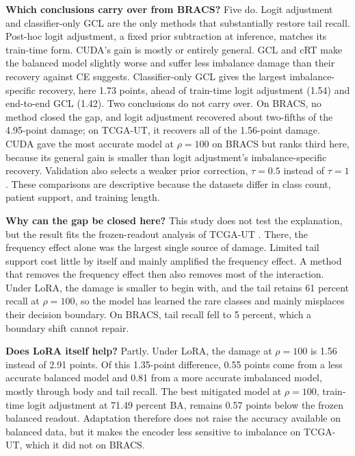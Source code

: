 \textbf{Which conclusions carry over from BRACS?} Five do. Logit adjustment and classifier-only GCL are the only methods that substantially restore tail recall. Post-hoc logit adjustment, a fixed prior subtraction at inference, matches its train-time form. CUDA's gain is mostly or entirely general. GCL and cRT make the balanced model slightly worse and suffer less imbalance damage than their recovery against CE suggests. Classifier-only GCL gives the largest imbalance-specific recovery, here 1.73 points, ahead of train-time logit adjustment (1.54) and end-to-end GCL (1.42). Two conclusions do not carry over. On BRACS, no method closed the gap, and logit adjustment recovered about two-fifths of the 4.95-point damage; on TCGA-UT, it recovers all of the 1.56-point damage. CUDA gave the most accurate model at $\rho=100$ on BRACS but ranks third here, because its general gain is smaller than logit adjustment's imbalance-specific recovery. Validation also selects a weaker prior correction, $\tau=0.5$ instead of $\tau=1$. These comparisons are descriptive because the datasets differ in class count, patient support, and training length.

\textbf{Why can the gap be closed here?} This study does not test the explanation, but the result fits the frozen-readout analysis of TCGA-UT \citep{queisler2026causeTcga}. There, the frequency effect alone was the largest single source of damage. Limited tail support cost little by itself and mainly amplified the frequency effect. A method that removes the frequency effect then also removes most of the interaction. Under LoRA, the damage is smaller to begin with, and the tail retains 61 percent recall at $\rho=100$, so the model has learned the rare classes and mainly misplaces their decision boundary. On BRACS, tail recall fell to 5 percent, which a boundary shift cannot repair.

\textbf{Does LoRA itself help?} Partly. Under LoRA, the damage at $\rho=100$ is 1.56 instead of 2.91 points. Of this 1.35-point difference, 0.55 points come from a less accurate balanced model and 0.81 from a more accurate imbalanced model, mostly through body and tail recall. The best mitigated model at $\rho=100$, train-time logit adjustment at 71.49 percent BA, remains 0.57 points below the frozen balanced readout. Adaptation therefore does not raise the accuracy available on balanced data, but it makes the encoder less sensitive to imbalance on TCGA-UT, which it did not on BRACS.


